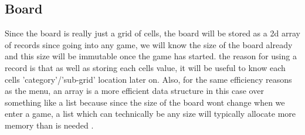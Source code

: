\documentclass{article}
\begin{document}
\subsection{Board}
Since the board is really just a grid of cells, the board will be stored as a 2d array of records since going into any game, we will know the size of the board already and this size will be immutable once the game has started. the reason for using a record is that as well as storing each cells value, it will be useful to know each cells 'category'/'sub-grid' location later on.
Also, for the same efficiency reasons as the menu, an array is a more efficient data structure in this case over something like a list because since the size of the board wont change when we enter a game, a list which can technically be any size will typically allocate more memory than is needed \parencite{sedgewick2011}.
\end{document}
